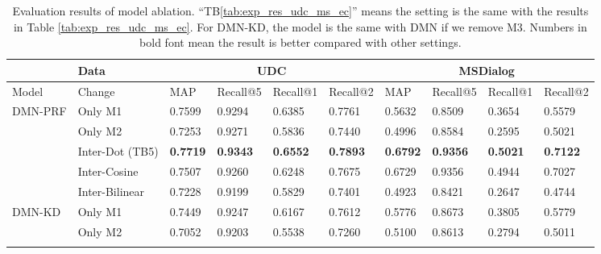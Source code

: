 \begin{table*}[]
	\footnotesize
	\centering
	\caption{Evaluation results of model ablation. ``TB\ref{tab:exp_res_udc_ms_ec}'' means the setting is the same with the results in Table \ref{tab:exp_res_udc_ms_ec}. For DMN-KD, the model is the same with DMN if we remove M3. Numbers in bold font mean the result is better compared with other settings.}
	\vspace{-0.1in}
	\label{tab:model_ablation_results}
	\begin{tabular}{l|l|l|l|l|l|l|l|l|l}
		\hline \hline
		& Data            & \multicolumn{4}{c|}{UDC}                                              & \multicolumn{4}{c}{MSDialog}                                         \\ \hline
		Model                    & Change          & MAP             & Recall@5        & Recall@1        & Recall@2        & MAP             & Recall@5        & Recall@1        & Recall@2        \\ \hline \hline
		\multirow{5}{*}{DMN-PRF} & Only M1         & 0.7599          & 0.9294          & 0.6385          & 0.7761          & 0.5632          & 0.8509          & 0.3654          & 0.5579          \\ \cline{2-10} 
		& Only M2         & 0.7253          & 0.9271          & 0.5836          & 0.7440          & 0.4996          & 0.8584          & 0.2595          & 0.5021          \\ \cline{2-10} 
		& Inter-Dot (TB5) & \textbf{0.7719} & \textbf{0.9343} & \textbf{0.6552} & \textbf{0.7893} & \textbf{0.6792} & \textbf{0.9356} & \textbf{0.5021} & \textbf{0.7122} \\ \cline{2-10} 
		& Inter-Cosine    & 0.7507          & 0.9260          & 0.6248          & 0.7675          & 0.6729          & 0.9356          & 0.4944          & 0.7027          \\ \cline{2-10} 
		& Inter-Bilinear  & 0.7228          & 0.9199          & 0.5829          & 0.7401          & 0.4923          & 0.8421          & 0.2647          & 0.4744          \\ \hline
		\multirow{9}{*}{DMN-KD}  & Only M1         & 0.7449          & 0.9247          & 0.6167          & 0.7612          & 0.5776          & 0.8673          & 0.3805          & 0.5779          \\ \cline{2-10} 
		& Only M2         & 0.7052          & 0.9203          & 0.5538          & 0.7260          & 0.5100          & 0.8613          & 0.2794          & 0.5011          \\ \cline{2-10} 

\end{tabular}
\end{table*}
